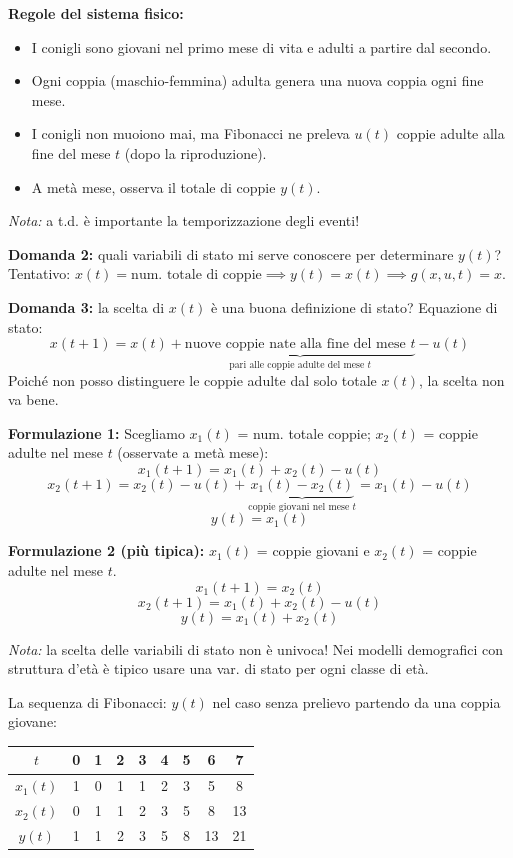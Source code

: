 \documentclass[11pt,a4paper]{article}
\begin{document}
\textbf{Regole del sistema fisico:}
\begin{itemize}
    \item I conigli sono giovani nel primo mese di vita e adulti a partire dal secondo.
    \item Ogni coppia (maschio-femmina) adulta genera una nuova coppia ogni fine mese.
    \item I conigli non muoiono mai, ma Fibonacci ne preleva $u(t)$ coppie adulte alla fine del mese $t$ (dopo la riproduzione).
    \item A metà mese, osserva il totale di coppie $y(t)$.
\end{itemize}
\textit{Nota:} a t.d. è importante la temporizzazione degli eventi!

\textbf{Domanda 2:} quali variabili di stato mi serve conoscere per determinare $y(t)$?
Tentativo: $x(t) = \text{num. totale di coppie} \implies y(t) = x(t) \implies g(x, u, t) = x$.

\textbf{Domanda 3:} la scelta di $x(t)$ è una buona definizione di stato?
Equazione di stato:
$$x(t+1) = x(t) + \underbrace{\text{nuove coppie nate alla fine del mese } t}_{\text{pari alle coppie adulte del mese } t} - u(t)$$
Poiché non posso distinguere le coppie adulte dal solo totale $x(t)$, la scelta non va bene. 

\textbf{Formulazione 1:} Scegliamo $x_1(t)$ = num. totale coppie; $x_2(t)$ = coppie adulte nel mese $t$ (osservate a metà mese):
$$x_1(t+1) = x_1(t) + x_2(t) - u(t)$$
$$x_2(t+1) = x_2(t) - u(t) + \underbrace{x_1(t) - x_2(t)}_{\text{coppie giovani nel mese } t} = x_1(t) - u(t)$$
$$y(t) = x_1(t)$$

\textbf{Formulazione 2 (più tipica):} $x_1(t)$ = coppie giovani e $x_2(t)$ = coppie adulte nel mese $t$.
$$x_1(t+1) = x_2(t)$$
$$x_2(t+1) = x_1(t) + x_2(t) - u(t)$$
$$y(t) = x_1(t) + x_2(t)$$

\textit{Nota:} la scelta delle variabili di stato non è univoca! Nei modelli demografici con struttura d'età è tipico usare una var. di stato per ogni classe di età.

La sequenza di Fibonacci: $y(t)$ nel caso senza prelievo partendo da una coppia giovane:

\begin{table}[htbp]
    \centering
    \begin{tabular}{c|cccccccc}
        $t$ & 0 & 1 & 2 & 3 & 4 & 5 & 6 & 7 \\
        \hline
        $x_1(t)$ & 1 & 0 & 1 & 1 & 2 & 3 & 5 & 8 \\
        $x_2(t)$ & 0 & 1 & 1 & 2 & 3 & 5 & 8 & 13 \\
        \hline
        $y(t)$ & 1 & 1 & 2 & 3 & 5 & 8 & 13 & 21
    \end{tabular}
\end{table}
\end{document}
